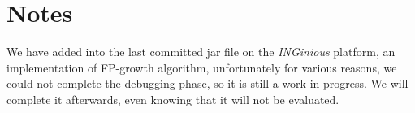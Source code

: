 \documentclass[11pt, a4paper]{article}
\begin{document}
	\section{Notes}
		We have added into the last committed jar file on the \textit{INGinious} platform, an implementation of FP-growth algorithm, unfortunately for various reasons, we could not complete the debugging phase, so it is still a work in progress. We will complete it afterwards, even knowing that it will not be evaluated.
\end{document}
